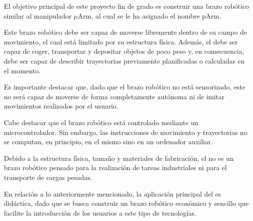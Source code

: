 
El objetivo principal de este proyecto fin de grado es construir una brazo robótico similar al manipulador $\mu$Arm, al cual se le ha asignado el nombre \ac{pArm}.

Este brazo robótico debe ser capaz de moverse libremente dentro de su campo de movimiento, el cual está limitado por su estructura física. Además, el \pArm{} debe ser capaz de coger, transportar y depositar objetos de poco peso y, en consecuencia, debe ser capaz de describir trayectorias previamente planificadas o calculadas en el momento.

Es importante destacar que, dado que el brazo robótico \pArm{} no está sensorizado, este no será capaz de moverse de forma completamente autónoma ni de imitar movimientos realizados por el usuario.

Cabe destacar que el brazo robótico está controlado mediante un microcontrolador. Sin embargo, las instrucciones de movimiento y trayectorias no se computan, en principio, en el mismo sino en un ordenador auxiliar.

Debido a la estructura física, tamaño y materiales de fabricación, el \pArm{} no es un brazo robótico pensado para la realización de tareas industriales ni para el transporte de cargas pesadas.

En relación a lo anteriormente mencionado, la aplicación principal del \pArm{} es didáctica, dado que se busca construir un brazo robótico económico y sencillo que facilite la introducción de los usuarios a este tipo de tecnologías.
